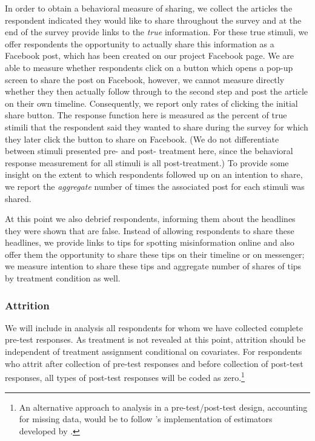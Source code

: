 \documentclass[letterpaper, 12pt, parskip=full,]{scrartcl}
\begin{document}
In order to obtain a behavioral measure of sharing, we collect the articles the respondent indicated they would like to share throughout the survey and at the end of the survey provide links to the \textit{true} information. For these true stimuli, we offer respondents the opportunity to actually share this information as a Facebook post, which has been created on our project Facebook page. We are able to measure whether respondents click on a button which opens a pop-up screen to share the post on Facebook, however, we cannot measure directly whether they then actually follow through to the second step and post the article on their own timeline. Consequently, we report only rates of clicking the initial share button. The response function here is measured as the percent of true stimili that the respondent said they wanted to share during the survey for which they later click the button to share on Facebook. (We do not differentiate between stimuli presented pre- and post- treatment here, since the behavioral response measurement for all stimuli is all post-treatment.) To provide some insight on the extent to which respondents followed up on an intention to share, we report the \textit{aggregate} number of times the associated post for each stimuli was shared. %

At this point we also debrief respondents, informing them about the headlines they were shown that are false. Instead of allowing respondents to share these headlines, we provide links to tips for spotting misinformation online and also offer them the opportunity to share these tips on their timeline or on messenger; we measure intention to share these tips and aggregate number of shares of tips by treatment condition as well. 


\subsubsection{Attrition} We will include in analysis all respondents for whom we have collected complete pre-test responses. As treatment is not revealed at this point, attrition should be independent of treatment assignment conditional on covariates. For respondents who attrit after collection of pre-test responses and before collection of post-test responses, all types of post-test responses will be coded as zero.\footnote{An alternative approach to analysis in a pre-test/post-test design, accounting for missing data, would be to follow \cite{davidian2005semiparametric}'s implementation of estimators developed by \cite{robins1994estimation}.}
\end{document}
